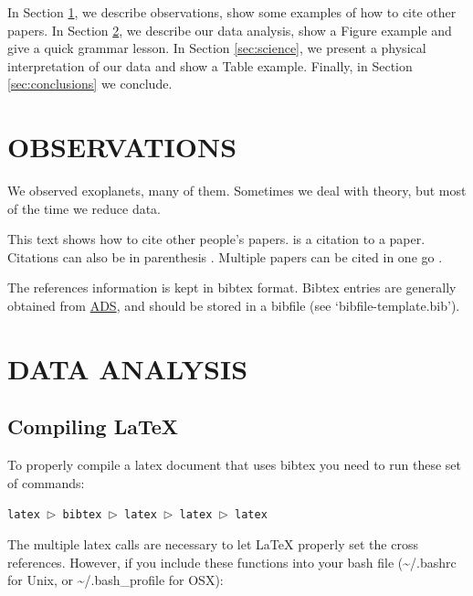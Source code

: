In Section \ref{sec:observations}, we describe observations, show some
examples of how to cite other papers.  In Section
\ref{sec:dataanalysis}, we describe our data analysis, show a Figure
example and give a quick grammar lesson.  In Section
\ref{sec:science}, we present a physical interpretation of our data
and show a Table example.  Finally, in Section \ref{sec:conclusions}
we conclude.

\section{OBSERVATIONS}
\label{sec:observations}

We observed exoplanets, many of them.  Sometimes we deal with theory,
but most of the time we reduce data.

This text shows how to cite other people's papers.
\citet{HarringtonEtal2006sciuandbphas} is a citation to a paper.
Citations can also be in parenthesis
\citep[e.g.,][]{HarringtonEtal2007natHD149026b}.  Multiple papers can
be cited in one go \citep{StevensonEtal2010natGJ436b,
  StevensonEtal2012apjHD149026b, StevensonEtal2012apjGJ436c,
  BlecicEtal2013apjWASP14b, BlecicEtal2014apjWASP43b,
  CubillosEtal2013apjWASP8b, CubillosEtal2014apjTrES1,
  CampoEtal2011apjWASP12b, NymeyerEtal2011apjWASP18b}.

The references information is kept in bibtex format.  Bibtex entries
are generally obtained from
\href{http://adsabs.harvard.edu/abstract_service.html}{ADS}, and
should be stored in a bibfile (see `bibfile-template.bib').


\section{DATA ANALYSIS}
\label{sec:dataanalysis}

\subsection{Compiling LaTeX}
\label{sec:compile}

To properly compile a latex document that uses bibtex you need to run
these set of commands: \newline

\indent \texttt{latex $\triangleright$ bibtex $\triangleright$ latex
  $\triangleright$ latex $\triangleright$ latex} \newline

The multiple latex calls are necessary to let LaTeX properly set the
cross references.  However, if you include these functions
into your bash file (\sim/.bashrc for Unix, or \sim/.bash\_profile for OSX): \\

